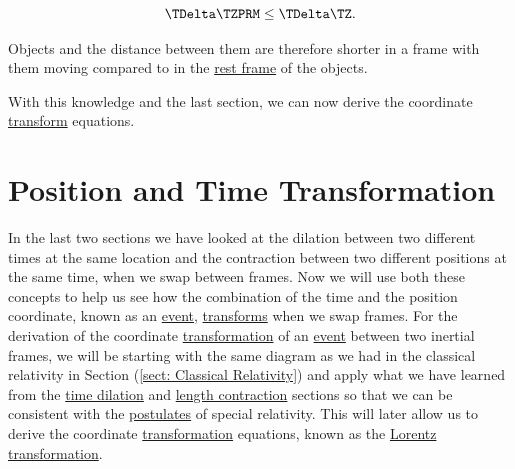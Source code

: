 \begin{equation}
	{\TDelta   \TZPRM } \leq {\TDelta   \TZ }.
\end{equation}

Objects and the distance between them are therefore shorter in a frame with them moving compared to in the \hyperlink{def-proper-frame}{rest frame} of the objects.

With this knowledge and the last section, we can now derive the coordinate \hyperlink{def-transform}{transform} equations.

\section{Position and Time Transformation} \label{sect: Position and Time Transformation}

In the last two sections we have looked at the dilation between two different times at the same location and the contraction between two different positions at the same time, when we swap between frames.
Now we will use both these concepts to help us see how the combination of the time and the position coordinate, known as an \hyperlink{def-event}{event}, \hyperlink{def-transform}{transforms} when we swap frames.
For the derivation of the coordinate \hyperlink{def-transform}{transformation} of an \hyperlink{def-event}{event} between two inertial frames, we will be starting with the same diagram as we had in the classical relativity in Section (\ref{sect: Classical Relativity}) and apply what we have learned from the \hyperlink{def-time-dilation}{time dilation} and \hyperlink{def-length-contraction}{length contraction} sections so that we can be consistent with the \hyperlink{def-postulates}{postulates} of special relativity.
This will later allow us to derive the coordinate \hyperlink{def-transform}{transformation} equations, known as the \hyperlink{def-lorentz-transform}{Lorentz transformation}.

